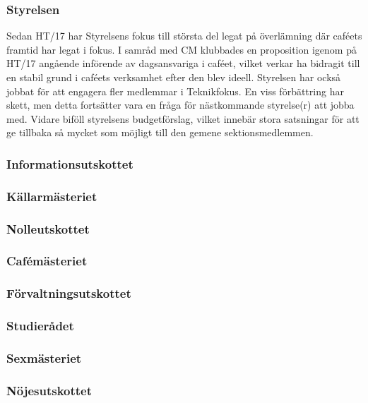 \documentclass[../_main/handlingar.tex]{subfiles}
\begin{document}

\subsubsection*{Styrelsen}
Sedan HT/17 har Styrelsens fokus till största del legat på överlämning där caféets framtid har legat i fokus. I samråd med CM klubbades en proposition igenom på HT/17 angående införende av dagsansvariga i caféet, vilket verkar ha bidragit till en stabil grund i caféets verksamhet efter den blev ideell. Styrelsen har också jobbat för att engagera fler medlemmar i Teknikfokus. En viss förbättring har skett, men detta fortsätter vara en fråga för nästkommande styrelse(r) att jobba med. Vidare biföll styrelsens budgetförslag, vilket innebär stora satsningar för att ge tillbaka så mycket som möjligt till den gemene sektionsmedlemmen.

\subsubsection*{Informationsutskottet}

\subsubsection*{Källarmästeriet}

\subsubsection*{Nolleutskottet}

\subsubsection*{Cafémästeriet}

\subsubsection*{Förvaltningsutskottet}

\subsubsection*{Studierådet}

\subsubsection*{Sexmästeriet}

\subsubsection*{Nöjesutskottet}
\end{document}
